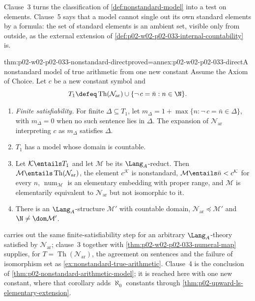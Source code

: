 Clause~3 turns the classification of \cref{def:nonstandard-model} into a test
on elements.  Clause~5 says that a model cannot single out its own standard
elements by a formula: the set of standard elements is an ambient set, visible
only from outside, as the external extension of
\cref{def:p02-w02-p02-033-internal-countability} is.

\begin{hbtheorem}{thm:p02-w02-p02-033-nonstandard-direct}{proved=annex:p02-w02-p02-033-direct}{A nonstandard model of true arithmetic from one new constant}
Assume the Axiom of Choice.  Let \(c\) be a new constant symbol and
\[
 T_1\defeq\operatorname{Th}(\mathcal N_{\mathrm{ar}})\cup
 \{\neg\,c=\bar n:n\in\N\}.
\]
\begin{enumerate}
  \item \emph{Finite satisfiability.}  For finite \(\Delta\subseteq T_1\),
        let \(m_\Delta=1+\max\{n:\neg\,c=\bar n\in\Delta\}\), with
        \(m_\Delta=0\) when no such sentence lies in \(\Delta\).  The
        expansion of \(\mathcal N_{\mathrm{ar}}\) interpreting \(c\) as
        \(m_\Delta\) satisfies \(\Delta\).
  \item \(T_1\) has a model whose domain is countable.
  \item Let \(\mathcal K\entails T_1\) and let \(\mathcal M\) be its
        \(\Lang_A\)-reduct.  Then
        \(\mathcal M\entails\operatorname{Th}(\mathcal N_{\mathrm{ar}})\),
        the element \(c^{\mathcal K}\) is nonstandard,
        \(\mathcal M\entails\bar n<c^{\mathcal K}\) for every \(n\),
        \(\operatorname{num}_{\mathcal M}\) is an elementary embedding with
        proper range, and \(\mathcal M\) is elementarily equivalent to
        \(\mathcal N_{\mathrm{ar}}\) but not isomorphic to it.
  \item There is an \(\Lang_A\)-structure \(\mathcal M'\) with countable
        domain, \(\mathcal N_{\mathrm{ar}}\preccurlyeq\mathcal M'\) and
        \(\N\ne\dom\mathcal M'\).
\end{enumerate}
\end{hbtheorem}

 carries out the same finite-satisfiability step
for an arbitrary \(\Lang_A\)-theory satisfied by \(\mathcal N_{\mathrm{ar}}\);
clause~3 together with \cref{thm:p02-w02-p02-033-numeral-map} supplies, for
\(T=\operatorname{Th}(\mathcal N_{\mathrm{ar}})\), the agreement on sentences
and the failure of isomorphism set as \cref{ex:nonstandard-true-arithmetic}.
Clause~4 is the conclusion of \cref{thm:p02-nonstandard-arithmetic-model}; it
is reached here with one new constant, where that corollary adds
\(\aleph_0\) constants through
\cref{thm:p02-upward-ls-elementary-extension}.

